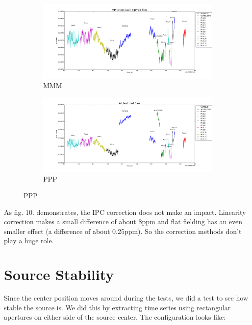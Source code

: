 \documentclass{aastex6}
\begin{document}
\begin{figure}[H]
    \centering
    \begin{subfigure}{1}
        \includegraphics[scale = 0.3]{plot_mmm}
        \caption{MMM}
    \end{subfigure}

    \begin{subfigure}{2}
        \includegraphics[scale=0.3]{plot_PPP}
        \caption{PPP}
    \end{subfigure}
\end{figure}

As fig. 10. demonstrates, the IPC correction does not make an impact. Linearity correction makes a small difference of about 8ppm and flat fielding has an even smaller effect (a difference of about 0.25ppm). So the correction methods don't play a huge role.  \\




\section{Source Stability}

Since the center position moves around during the tests, we did a test to see how stable the source is. We did this by extracting time series using rectangular apertures on either side of the source center. The configuration looks like:\\
\end{document}
